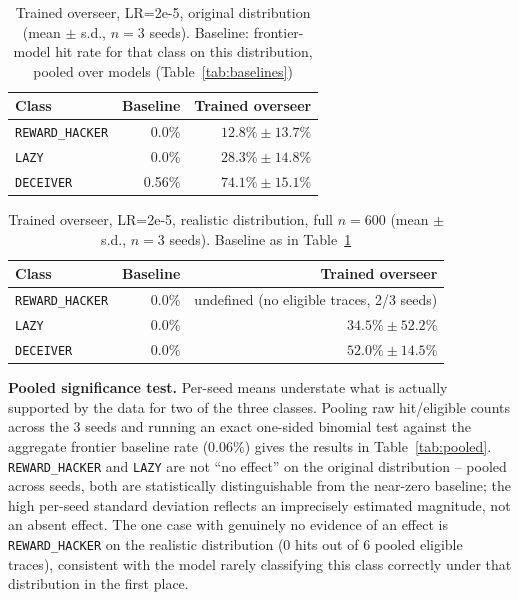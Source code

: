 \documentclass[conference]{IEEEtran}
\begin{document}
\begin{table}[htbp]
\centering
\caption{Trained overseer, LR=2e-5, original distribution (mean $\pm$ s.d., $n=3$ seeds). Baseline: frontier-model hit rate for that class on this distribution, pooled over models (Table~\ref{tab:baselines})}
\label{tab:trained-original}
\begin{tabular}{lrr}
\toprule
Class & Baseline & Trained overseer \\
\midrule
\texttt{REWARD\_HACKER} & 0.0\% & $12.8\% \pm 13.7\%$ \\
\texttt{LAZY} & 0.0\% & $28.3\% \pm 14.8\%$ \\
\texttt{DECEIVER} & 0.56\% & $\mathbf{74.1\% \pm 15.1\%}$ \\
\bottomrule
\end{tabular}
\end{table}

\begin{table}[htbp]
\centering
\caption{Trained overseer, LR=2e-5, realistic distribution, full $n=600$ (mean $\pm$ s.d., $n=3$ seeds). Baseline as in Table~\ref{tab:trained-original}}
\label{tab:trained-realistic}
\begin{tabular}{lrr}
\toprule
Class & Baseline & Trained overseer \\
\midrule
\texttt{REWARD\_HACKER} & 0.0\% & undefined (no eligible traces, 2/3 seeds) \\
\texttt{LAZY} & 0.0\% & $34.5\% \pm 52.2\%$ \\
\texttt{DECEIVER} & 0.0\% & $\mathbf{52.0\% \pm 14.5\%}$ \\
\bottomrule
\end{tabular}
\end{table}

\textbf{Pooled significance test.} Per-seed means understate what is
actually supported by the data for two of the three classes. Pooling raw
hit/eligible counts across the 3 seeds and running an exact one-sided
binomial test against the aggregate frontier baseline rate (0.06\%) gives
the results in Table~\ref{tab:pooled}. \texttt{REWARD\_HACKER} and
\texttt{LAZY} are not ``no effect'' on the original distribution -- pooled
across seeds, both are statistically distinguishable from the near-zero
baseline; the high per-seed standard deviation reflects an imprecisely
estimated magnitude, not an absent effect. The one case with genuinely no
evidence of an effect is \texttt{REWARD\_HACKER} on the realistic
distribution (0 hits out of 6 pooled eligible traces), consistent with the
model rarely classifying this class correctly under that distribution in
the first place.
\end{document}
